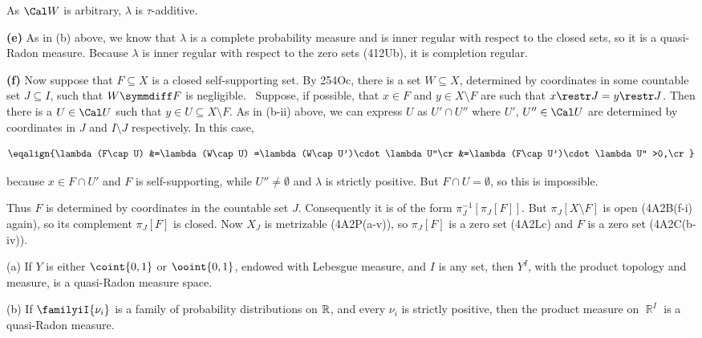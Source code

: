 {

\noindent As $\Cal W$ is arbitrary, $\lambda$ is $\tau$-additive.\ \Qed

\medskip

{\bf (e)} As in (b) above, we know that $\lambda$ is a complete
probability
measure and is inner regular with respect to the closed sets, so it is a
quasi-Radon measure.   Because $\lambda$ is inner regular with respect
to the zero sets (412Ub), it is completion regular.

\medskip

{\bf (f)} Now suppose that $F\subseteq X$ is a closed self-supporting
set.   By 254Oc, there is a set $W\subseteq X$, determined by
coordinates in some countable set $J\subseteq I$, such that
$W\symmdiff F$ is negligible.   \Quer\ Suppose, if possible, that
$x\in F$ and $y\in X\setminus F$ are such that $x\restr J=y\restr J$.
Then there is a $U\in\Cal U$ such that $y\in U\subseteq X\setminus F$.
As in (b-ii) above, we can express $U$ as $U'\cap U''$ where $U'$,
$U''\in\Cal U$ are determined by coordinates in $J$ and $I\setminus J$
respectively.   In this case,

$$\eqalign{\lambda(F\cap U)
&=\lambda(W\cap U)
=\lambda(W\cap U')\cdot\lambda U''\cr
&=\lambda(F\cap U')\cdot\lambda U''
>0,\cr}$$

\noindent because $x\in F\cap U'$ and $F$ is self-supporting, while
$U''\ne\emptyset$ and $\lambda$ is strictly positive.   But $F\cap
U=\emptyset$, so this is impossible.\ \Bang

Thus $F$ is determined by coordinates in the countable set $J$.
Consequently it is of the form $\pi_J^{-1}[\pi_J[F]]$.   But
$\pi_J[X\setminus F]$ is open (4A2B(f-i) again), 
so its complement $\pi_J[F]$
is closed.   Now $X_J$ is metrizable (4A2P(a-v)), so $\pi_J[F]$ is a
zero set (4A2Lc) and $F$ is a zero set (4A2C(b-iv)).
}%

 (a) If $Y$ is either
$\coint{0,1}$ or $\ooint{0,1}$, endowed with Lebesgue measure, and $I$
is any set, then $Y^I$, with the product topology and measure, is a
quasi-Radon measure space.

(b) If $\familyiI{\nu_i}$ is a family of probability distributions on
$\Bbb R$, and every $\nu_i$ is strictly positive, then the product
measure on $\BbbR^I$ is a quasi-Radon measure.

